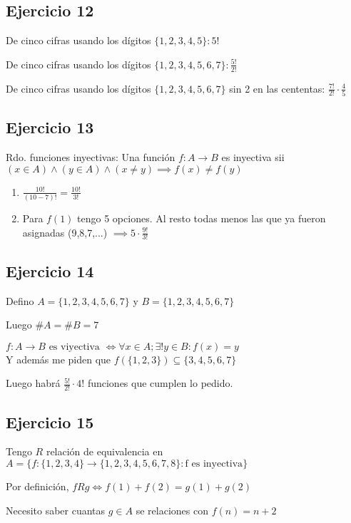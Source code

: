 \subsection{Ejercicio 12}
De cinco cifras usando los dígitos $\{ 1,2,3,4,5 \}: 5!$

De cinco cifras usando los dígitos $\{ 1,2,3,4,5,6,7 \}: \frac{5!}{2!}$

De cinco cifras usando los dígitos $\{ 1,2,3,4,5,6,7 \}$ sin 2 en las cententas: $\frac{7!}{2!} \cdot \frac{4}{5}$

\subsection{Ejercicio 13}
Rdo. funciones inyectivas: Una función $f: A\rightarrow B$ es inyectiva sii $ (x \in A) \wedge (y \in A) \wedge (x\neq y) \implies f(x) \neq f(y)$ 

\begin{enumerate}
    \item $\frac{10!}{(10-7)!} = \frac{10!}{3!}$
    \item Para $f(1)$ tengo 5 opciones. Al resto todas menos las que ya fueron asignadas (9,8,7,...) $ \implies 5 \cdot \frac{9!}{3!}$
\end{enumerate}

\subsection{Ejercicio 14}
Defino $A = \{ 1,2,3,4,5,6,7 \}$ y $B = \{ 1,2,3,4,5,6,7 \}$

Luego $\#A = \#B = 7$

$f: A \rightarrow B \text{ es viyectiva } \iff \forall x \in A; \exists ! y \in B: f(x) = y$ \\
Y además me piden que $ f(\{ 1,2,3 \}) \subseteq \{ 3,4,5,6,7 \} $

Luego habrá $ \frac{5!}{2!} \cdot 4! $ funciones que cumplen lo pedido.

\subsection{Ejercicio 15}
Tengo $R$ relación de equivalencia en $A=\{ f: \{ 1,2,3,4 \} \rightarrow \{ 1,2,3,4,5,6,7,8 \}: \text{f es inyectiva} \}$

Por definición, $fRg \iff f(1) + f(2) = g(1) + g(2)$

Necesito saber cuantas $g \in A$ se relaciones con $ f(n) = n+2 $

